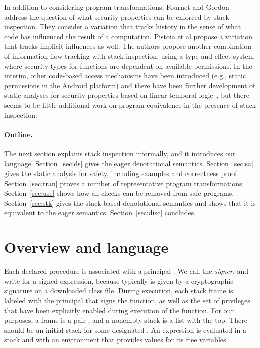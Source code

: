 \documentclass[submission,copyright,creativecommons]{eptcs}
\begin{document}
In addition to considering program transformations, Fournet and Gordon~\cite{FournetG03} 
 address the question of what security properties can be enforced by stack inspection.  They consider a variation that tracks history in the sense of what code has influenced the result of a computation.  Pistoia et al \cite{PistoiaBanerjeeNaumann} propose a variation that tracks implicit influences as well.  The authors \cite{BanerjeeNaumann03b} propose another combination of information flow tracking with stack inspection, using a type and effect system  where security types for functions are dependent on available permissions. 
In the interim, other code-based access mechanisms have been introduced (e.g., static permissions in the Android platform) and there have been further development of static analyses for security properties based on linear temporal logic~\cite{BessonJM01,BessonBFG04,BessonLJ05,skalkaSVh08},
but there seems to be little additional work on program equivalence in the presence of stack inspection. 



\paragraph{Outline.}

The next section explains stack inspection informally, and it introduces our language.
Section~\ref{sec:ds} gives the eager denotational semantics.
Section~\ref{sec:sa} gives the static analysis for safety, including examples and correctness proof.
Section~\ref{sec:tran} proves a number of representative program transformations.
Section~\ref{sec:use} shows how all checks can be removed from safe programs.
Section~\ref{sec:stk} gives the stack-based denotational semantics and shows that it is equivalent to the eager semantics.
Section~\ref{sec:disc} concludes.

\section{Overview and language} 
\label{sec:ov}


Each declared procedure is associated with a principal .  We call
 the \emph{signer}, and write  for a signed
expression, because typically  is given by a cryptographic
signature on a downloaded class file.  During execution, each stack
frame is labeled with the principal that signs the function, as well
as the set  of privileges that have been explicitly enabled during
execution of the function.  For our purposes, a frame is a pair
, and a nonempty stack is a list  with
 the top.  There should be an initial stack  for some designated .  An expression
is evaluated in a stack  and with an environment  that provides
values for its free variables.
\end{document}
